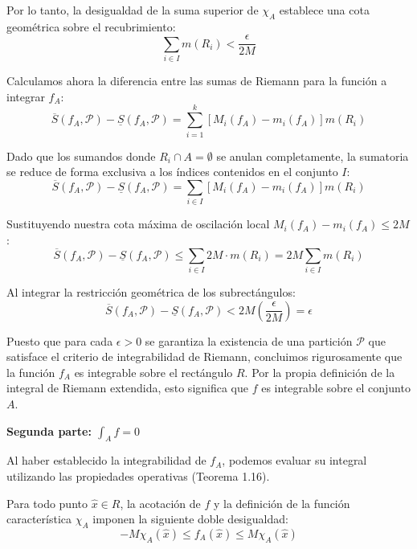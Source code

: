 \documentclass[11pt,letterpaper]{article}
\begin{document}
Por lo tanto, la desigualdad de la suma superior de $\chi_A$ establece una cota geométrica sobre el recubrimiento:
\begin{equation*}
\sum_{i \in I} m(R_i) < \frac{\epsilon}{2M}
\end{equation*}

Calculamos ahora la diferencia entre las sumas de Riemann para la función a integrar $f_A$:
\begin{equation*}
\overline{S}(f_A, \mathcal{P}) - \underline{S}(f_A, \mathcal{P}) = \sum_{i=1}^{k} \left[ M_i(f_A) - m_i(f_A) \right] m(R_i)
\end{equation*}

Dado que los sumandos donde $R_i \cap A = \emptyset$ se anulan completamente, la sumatoria se reduce de forma exclusiva a los índices contenidos en el conjunto $I$:
\begin{equation*}
\overline{S}(f_A, \mathcal{P}) - \underline{S}(f_A, \mathcal{P}) = \sum_{i \in I} \left[ M_i(f_A) - m_i(f_A) \right] m(R_i)
\end{equation*}

Sustituyendo nuestra cota máxima de oscilación local $M_i(f_A) - m_i(f_A) \le 2M$:
\begin{equation*}
\overline{S}(f_A, \mathcal{P}) - \underline{S}(f_A, \mathcal{P}) \le \sum_{i \in I} 2M \cdot m(R_i) = 2M \sum_{i \in I} m(R_i)
\end{equation*}

Al integrar la restricción geométrica de los subrectángulos:
\begin{equation*}
\overline{S}(f_A, \mathcal{P}) - \underline{S}(f_A, \mathcal{P}) < 2M \left( \frac{\epsilon}{2M} \right) = \epsilon
\end{equation*}

Puesto que para cada $\epsilon > 0$ se garantiza la existencia de una partición $\mathcal{P}$ que satisface el criterio de integrabilidad de Riemann, concluimos rigurosamente que la función $f_A$ es integrable sobre el rectángulo $R$. Por la propia definición de la integral de Riemann extendida, esto significa que $f$ es integrable sobre el conjunto $A$.

\vspace{0.5cm}
\textbf{Segunda parte: $\int_A f = 0$}

Al haber establecido la integrabilidad de $f_A$, podemos evaluar su integral utilizando las propiedades operativas (Teorema 1.16). 

Para todo punto $\hat{x} \in R$, la acotación de $f$ y la definición de la función característica $\chi_A$ imponen la siguiente doble desigualdad:
\begin{equation*}
-M \chi_A(\hat{x}) \le f_A(\hat{x}) \le M \chi_A(\hat{x})
\end{equation*}
\end{document}
